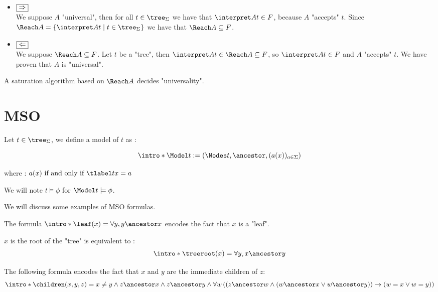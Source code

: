 \documentclass{article}
\begin{document}
\begin{proofI}
	\begin{itemize}
		\item $\fbox{$\Rightarrow$}$\\
		      We suppose $A$ "universal", then for all $t \in \tree_\Sigma$ we have that $\interpret A t \in F$, because $A$ "accepts" $t$.
		      Since $\Reach A = \setdef {\interpret A t} {t\in \tree_\Sigma}$ we have that $\Reach A \subseteq F$.

		\item $\fbox{$\Leftarrow$}$\\
		      We suppose $\Reach A \subseteq F$. Let $t$ be a "tree", then $\interpret A t \in \Reach A \subseteq F$, so $\interpret A t \in F$ and $A$
		      "accepts" $t$. We have proven that $A$ is "universal".
	\end{itemize}
\end{proofI}


\begin{coro}\label{coro:univeral-Reach}
	A saturation algorithm based on $\Reach A$ decides "universality".
\end{coro}


\section{MSO}

\begin{definition}
	Let $t \in \tree_{\Sigma}$, we define a model of $t$ as :

	\[\intro* \Model t := (\Nodes t, \ancestor , (a (x))_{a \in \Sigma}) \]

	where : $a(x) \tiff \tlabel t x = a$

	We will note $t \models \phi$ for $\Model t \models \phi$. 
\end{definition}


We will discuss some examples of MSO formulas.

\begin{example}
	The formula $\intro* \leaf (x) = \forall y,  y \ancestor x$ encodes the fact that $x$ is a "leaf".
\end{example}

\begin{example}
	$x$ is the root of the "tree" is equivalent to :
	\[\intro* \treeroot (x) = \forall y,  x \ancestor y \]
\end{example}

\begin{example}
	The following formula encodes the fact that $x$ and $y$ are the immediate children of $z$:
	\[\intro* \children (x,y,z) =
		x \neq y \land
		z  \ancestor  x \land  z \ancestor y \land
		\forall w
		\left( \left(
			z \ancestor w \land
				(w \ancestor x \lor w \ancestor  y) \right) \rightarrow (
			w = x \lor w = y
			)
		\right) \]
\end{example}
\end{document}
